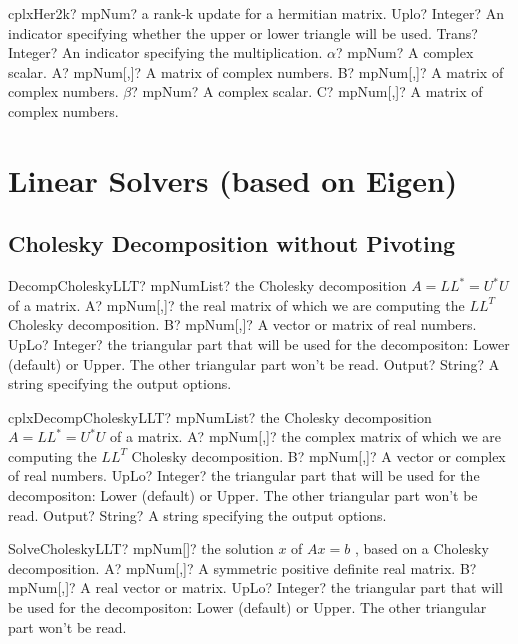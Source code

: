 \documentclass[12pt,a4paper,openany]{book}
\begin{document}
\begin{mpFunctionsExtract}
\mpFunctionSeven
{cplxHer2k? mpNum? a rank-k update for a hermitian matrix.}
{Uplo? Integer? An indicator specifying whether the upper or lower triangle will be used.}
{Trans? Integer? An indicator specifying the multiplication.}
{$\alpha$? mpNum? A complex scalar.}
{A? mpNum[,]? A matrix of complex numbers.}
{B? mpNum[,]? A matrix of complex numbers.}
{$\beta$? mpNum? A complex scalar.}
{C? mpNum[,]? A matrix of complex numbers.}
\end{mpFunctionsExtract}

\chapter{Linear Solvers (based on Eigen)}

\section{Cholesky Decomposition without Pivoting}

\begin{mpFunctionsExtract}
\mpFunctionFour
{DecompCholeskyLLT? mpNumList? the Cholesky decomposition $A = LL^* = U^*U$ of a matrix.}
{A? mpNum[,]? the real matrix of which we are computing the $LL^T$ Cholesky decomposition.}
{B? mpNum[,]? A vector or matrix of real numbers.}
{UpLo? Integer? the triangular part that will be used for the decompositon: Lower (default) or Upper. The other triangular part won't be read.}
{Output? String? A string specifying the output options.}
\end{mpFunctionsExtract}

\begin{mpFunctionsExtract}
\mpFunctionFour
{cplxDecompCholeskyLLT? mpNumList? the Cholesky decomposition $A = LL^* = U^*U$ of a matrix.}
{A? mpNum[,]? the complex matrix of which we are computing the $LL^T$ Cholesky decomposition.}
{B? mpNum[,]? A vector or complex of real numbers.}
{UpLo? Integer? the triangular part that will be used for the decompositon: Lower (default) or Upper. The other triangular part won't be read.}
{Output? String? A string specifying the output options.}
\end{mpFunctionsExtract}

\begin{mpFunctionsExtract}
\mpFunctionThree
{SolveCholeskyLLT? mpNum[]? the solution $x$ of $A x = b$ , based on a Cholesky decomposition.}
{A? mpNum[,]? A symmetric positive definite real matrix.}
{B? mpNum[,]? A real vector or matrix.}
{UpLo? Integer? the triangular part that will be used for the decompositon: Lower (default) or Upper. The other triangular part won't be read.}
\end{mpFunctionsExtract}
\end{document}
